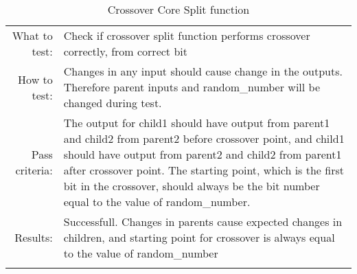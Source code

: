 \begin{table}[H]
  \begin{tabular}{r | p{9cm}}
    \noalign{\smallskip}\hline\noalign{\smallskip}
    
    What to test:  & Check if crossover split function performs crossover correctly, 
                        from correct bit \\

    \noalign{\smallskip}\hline\noalign{\smallskip}

    How to test:   &    Changes in any input should cause change in the outputs.
                        Therefore parent inputs and random\_number will be changed
                        during test. 
                        \\
                      
    \noalign{\smallskip}\hline\noalign{\smallskip}

    Pass criteria: &    The output for child1 should have output from parent1 and child2
                        from parent2 before crossover point, and child1 should have
                        output from parent2 and child2 from parent1 after crossover
                        point. 
                        The starting point, which is the first bit in the crossover,
                        should always be the bit number equal to the value of
                        random\_number.
                        \\
    \noalign{\smallskip}\hline\noalign{\smallskip}
    
    Results: &      Successfull. 
                    Changes in parents cause expected changes in children, and starting 
                    point for crossover is always equal to the value of random\_number
                    \\
   \noalign{\smallskip}\hline\noalign{\smallskip}
  
  
  
  \end{tabular}
  \caption{Crossover Core Split function}
  \label{testing:components:genetic_pipeline:crossover_core_split}
\end{table}
